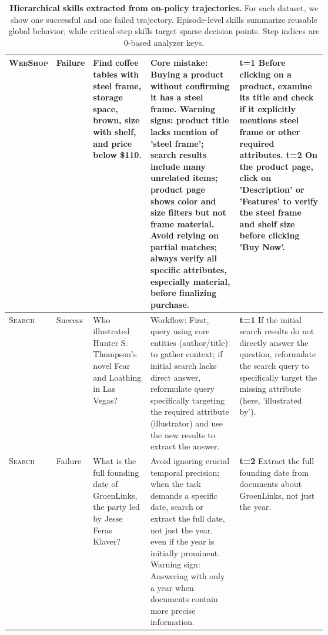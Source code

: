 \documentclass{llmxive}
\begin{document}
\begin{table}[ht!]
\begin{tabularx}{\linewidth}{
  >{\arraybackslash}p{0.10\linewidth}
  >{\arraybackslash}p{0.07\linewidth}
  >{\arraybackslash}p{0.18\linewidth}
  >{\arraybackslash}p{0.28\linewidth}
  >{\arraybackslash}X
}
\addlinespace[0.30em]

\textsc{WebShop}
&
Failure
&
Find coffee tables with steel frame, storage space, brown, size with shelf,
and price below \$110.
&
Core mistake: Buying a product without confirming it has a steel frame.
Warning signs: product title lacks mention of 'steel frame'; search results
include many unrelated items; product page shows color and size filters but
not frame material. Avoid relying on partial matches; always verify all
specific attributes, especially material, before finalizing purchase.
&
\textbf{t=1} Before clicking on a product, examine its title and check if it
explicitly mentions steel frame or other required attributes. \newline
\textbf{t=2} On the product page, click on 'Description' or 'Features' to
verify the steel frame and shelf size before clicking 'Buy Now'.
\\

\midrule

\textsc{Search}
&
Success
&
Who illustrated Hunter S. Thompson's novel Fear and Loathing in Las Vegas?
&
Workflow: First, query using core entities (author/title) to gather context;
if initial search lacks direct answer, reformulate query specifically targeting
the required attribute (illustrator) and use the new results to extract the
answer.
&
\textbf{t=1} If the initial search results do not directly answer the question,
reformulate the search query to specifically target the missing attribute
(here, 'illustrated by').
\\

\addlinespace[0.30em]

\textsc{Search}
&
Failure
&
What is the full founding date of GroenLinks, the party led by Jesse Feras
Klaver?
&
Avoid ignoring crucial temporal precision; when the task demands a specific
date, search or extract the full date, not just the year, even if the year is
initially prominent. Warning sign: Answering with only a year when documents
contain more precise information.
&
\textbf{t=2} Extract the full founding date from documents about GroenLinks,
not just the year.
\\

\bottomrule
\end{tabularx}
\caption{
\textbf{Hierarchical skills extracted from on-policy trajectories.}
For each dataset, we show one successful and one failed trajectory.
Episode-level skills summarize reusable global behavior, while critical-step
skills target sparse decision points. Step indices are 0-based analyzer keys.
}
\label{tab:hierarchical-skills-success-failure}
\end{table}
\end{document}
